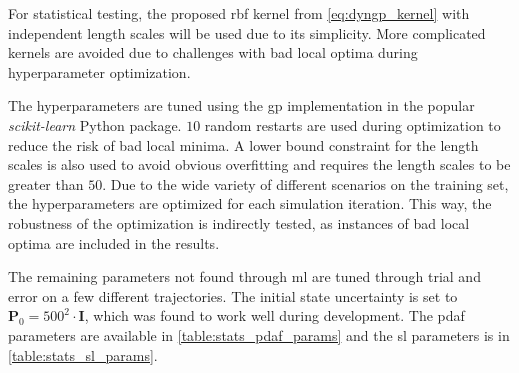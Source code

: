 For statistical testing, the proposed \acrshort{rbf} kernel from \cref{eq:dyngp_kernel} with independent length scales will be used due to its simplicity. More complicated kernels are avoided due to challenges with bad local optima during hyperparameter optimization.

The hyperparameters are tuned using the \acrshort{gp} implementation in the popular \textit{scikit-learn} \cite{scikit-learn} Python package. $10$ random restarts are used during optimization to reduce the risk of bad local minima. A lower bound constraint for the length scales is also used to avoid obvious overfitting and requires the length scales to be greater than $50$. Due to the wide variety of different scenarios on the training set, the hyperparameters are optimized for each simulation iteration. This way, the robustness of the optimization is indirectly tested, as instances of bad local optima are included in the results.


The remaining parameters not found through \acrshort{ml} are tuned through trial and error on a few different trajectories.
The initial state uncertainty is set to $\boldsymbol{P}_0 = 500^2 \cdot \boldsymbol{I}$, which was found to work well during development. The \acrshort{pdaf} parameters are available in \cref{table:stats_pdaf_params} and the \acrshort{sl} parameters is in \cref{table:stats_sl_params}.

